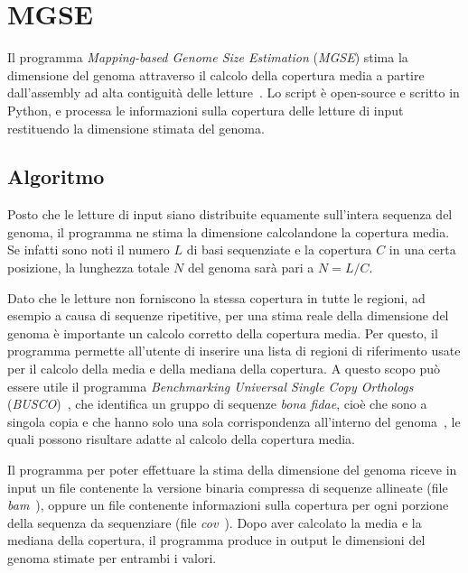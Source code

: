 \documentclass[crop=false, class=book]{standalone}
\begin{document}
	\section{MGSE}
	Il programma \textit{Mapping-based Genome Size Estimation} (\textit{MGSE}) stima la dimensione del genoma attraverso il calcolo della copertura media a partire dall'assembly ad alta contiguità delle letture~\cite{pucker2019MGSE}. Lo script è open-source e scritto in Python, e processa le informazioni sulla copertura delle letture di input restituendo la dimensione stimata del genoma.
	
	\subsection{Algoritmo}
	Posto che le letture di input siano distribuite equamente sull'intera sequenza del genoma, il programma ne stima la dimensione calcolandone la copertura media. Se infatti sono noti il numero $L$ di basi sequenziate e la copertura $C$ in una certa posizione, la lunghezza totale $N$ del genoma sarà pari a $N = L/C$.
	
	Dato che le letture non forniscono la stessa copertura in tutte le regioni, ad esempio a causa di sequenze ripetitive, per una stima reale della dimensione del genoma è importante un calcolo corretto della copertura media. Per questo, il programma permette all'utente di inserire una lista di regioni di riferimento usate per il calcolo della media e della mediana della copertura. A questo scopo può essere utile il programma \textit{Benchmarking Universal Single Copy Orthologs} (\textit{BUSCO})~\cite{simao2015busco}, che identifica un gruppo di sequenze \textit{bona fidae}, cioè che sono a singola copia e che hanno solo una sola corrispondenza all'interno del genoma~\cite{li2005trumatch}, le quali possono risultare adatte al calcolo della copertura media. 
	
	Il programma per poter effettuare la stima della dimensione del genoma riceve in input un file contenente la versione binaria compressa di sequenze allineate (file \textit{bam}~\cite{li2009sequence}), oppure un file contenente informazioni sulla copertura per ogni porzione della sequenza da sequenziare (file \textit{cov}~\cite{pucker2018genome}). Dopo aver calcolato la media e la mediana della copertura, il programma produce in output le dimensioni del genoma stimate per entrambi i valori.

	
	
	
\end{document}
